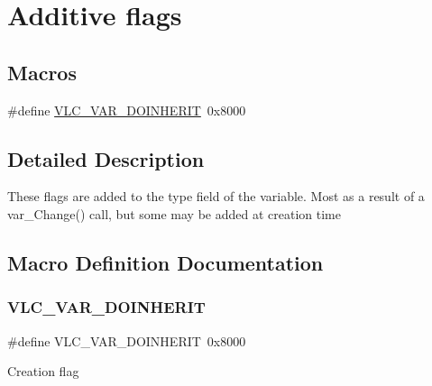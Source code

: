 \hypertarget{group__var__flags}{}\section{Additive flags}
\label{group__var__flags}
\subsection*{Macros}
\begin{DoxyCompactItemize}
\item 
\#define \hyperlink{group__var__flags_ga90304083168c5c91e730ea6f7e14d96a}{V\+L\+C\+\_\+\+V\+A\+R\+\_\+\+D\+O\+I\+N\+H\+E\+R\+IT}~0x8000
\end{DoxyCompactItemize}


\subsection{Detailed Description}
These flags are added to the type field of the variable. Most as a result of a var\+\_\+\+Change() call, but some may be added at creation time 

\subsection{Macro Definition Documentation}
\mbox{\label{group__var__flags_ga90304083168c5c91e730ea6f7e14d96a}} 
\subsubsection{\texorpdfstring{V\+L\+C\+\_\+\+V\+A\+R\+\_\+\+D\+O\+I\+N\+H\+E\+R\+IT}{VLC\_VAR\_DOINHERIT}}
{\footnotesize\ttfamily \#define V\+L\+C\+\_\+\+V\+A\+R\+\_\+\+D\+O\+I\+N\+H\+E\+R\+IT~0x8000}

Creation flag 